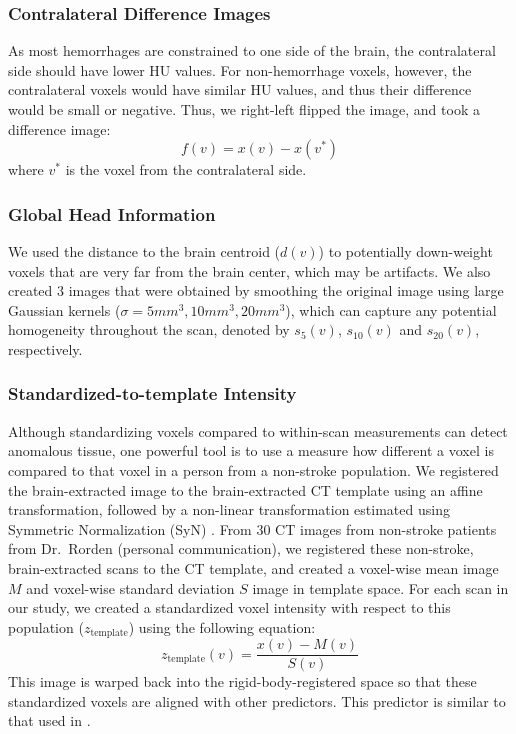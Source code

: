 \subsubsection{Contralateral Difference Images}  As most hemorrhages are constrained to one side of the brain, the contralateral side should have lower HU values.  For non-hemorrhage voxels, however, the contralateral voxels would have similar HU values, and thus their difference would be small or negative.  Thus, we right-left flipped the image, and took a difference image: 
\begin{equation}
f(v) = x(v) - x(v^{*}) \label{eq:flip}
\end{equation}
where $v^{*}$ is the voxel from the contralateral side.  



\subsubsection{Global Head Information} We used the distance to the brain centroid ($d(v)$) to potentially down-weight voxels that are very far from the brain center, which may be artifacts.    We also created $3$ images that were obtained by smoothing the original image using large Gaussian kernels ($\sigma = 5mm^3, 10mm^3, 20mm^3$), which can capture any potential homogeneity throughout the scan, denoted by $s_{5}(v)$, $s_{10}(v)$ and $s_{20}(v)$, respectively.   

\subsubsection{Standardized-to-template Intensity}  
Although standardizing voxels compared to within-scan measurements can detect anomalous tissue, one powerful tool is to use a measure how different a voxel is compared to that voxel in a person from a non-stroke population.  We registered the brain-extracted image to the brain-extracted CT template using an affine transformation, followed by a non-linear transformation estimated using Symmetric Normalization (SyN) \citep{avants_symmetric_2008}.  
From $30$ CT images from non-stroke patients from Dr.~Rorden (personal communication), we registered these non-stroke, brain-extracted scans to the CT template, and created a voxel-wise mean image $M$ and voxel-wise standard deviation $S$ image in template space.  For each scan in our study, we created a standardized voxel intensity with respect to this population ($z_{\text{template}}$) using the following equation:
$$
z_{\text{template}}(v) = \frac{x(v) - M(v)}{S(v)}
$$
This image is warped back into the rigid-body-registered space so that these standardized voxels are aligned with other predictors.  This predictor is similar to that used in \citet{gillebert_automated_2014}.  


